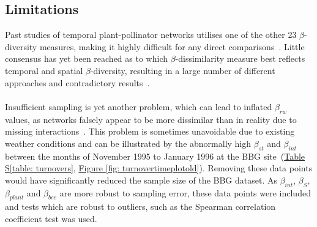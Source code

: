 \documentclass[11pt]{article}
\begin{document}
\subsection{Limitations}

Past studies of temporal plant-pollinator networks utilises one of the other 23 $\beta$-diversity measures, making it highly difficult for any direct comparisons~\citep{BASILIO2006, Alarcon2008, Olesen2008, Burkle2013}. Little consensus has yet been reached as to which $\beta$-dissimilarity measure best reflects temporal and spatial $\beta$-diversity, resulting in a large number of different approaches and contradictory results~\citep{Koleff2003, Poisot2015}.\\
\\
Insufficient sampling is yet another problem, which can lead to inflated $\beta_{rw}$ values, as networks falsely appear to be more dissimilar than in reality due to missing interactions~\citep{Vazquez2007, Dormann2009, Poisot2012a}. This problem is sometimes unavoidable due to existing weather conditions and can be illustrated by the abnormally high $\beta_{st}$ and $\beta_{int}$ between the months of November 1995 to January 1996 at the BBG site~(\hyperref[table: turnovers]{Table S\ref{table: turnovers}}, \hyperref[fig: turnovertimeplotold]{Figure \ref{fig: turnovertimeplotold}}). Removing these data points would have significantly reduced the sample size of the BBG dataset. As $\beta_{int}$, $\beta_{S}$, $\beta_{plant}$ and $\beta_{bee}$ are more robust to sampling error, these data points were included and tests which are robust to outliers, such as the Spearman correlation coefficient test was used.
\end{document}
